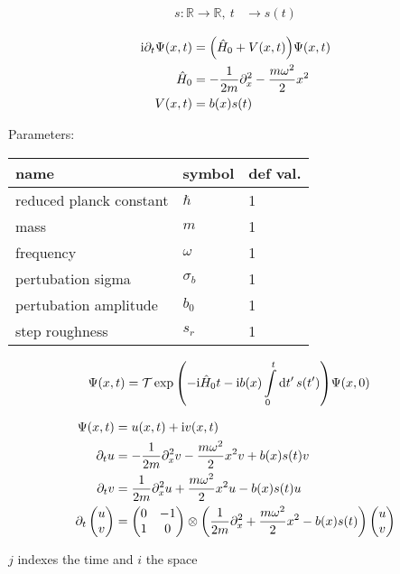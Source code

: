 \documentclass[a4paper,10pt]{article}
\newcommand{\mi}{\mathrm{i}}
\newcommand{\intl}{\int\limits}
\begin{document}
\begin{align}
    s:\mathbb{R}\to\mathbb{R},~
    t
    &\to
    s(t)
\end{align}


\begin{align}
    \mi
    \partial_t
    \Psi
    (x,t)
    &=
    \pqty{
    		\hat{H}_0
        +
        V(x,t)
    }
    \Psi
    (x,t)
\\
	\hat{H}_0
	&=
    -\frac{1}{2m}
    \partial_x^2
    -
    \frac{m\omega^2}{2}
    x^2
\\
    V(x,t)
    &=
    b(x)
    s(t)
\end{align}


Parameters:

\begin{tabular}{lll}
name&symbol&def val.\\
\hline
reduced planck constant&$\hbar$&1\\
mass&$m$&1\\
frequency&$\omega$&1\\
pertubation sigma&$\sigma_b$&1\\
pertubation amplitude&$b_0$&1\\
step roughness&$s_r$&1\
\end{tabular}





\begin{align}
    \Psi
    (x,t)
    &=
    \mathcal{T}
    \exp\pqty{
    		-
    		\mi
    		\hat{H}_0
    		t
    		-
		\mi b(x)
		\intl_0^t
		\dd{t^\prime}
		s(t^\prime)    
    }
    \Psi
    (x,0)
\end{align}



\begin{align}
	\Psi
	(x,t)
	&=
	u(x,t)
	+
	\mi v(x,t)
\\
	\partial_t u
	&=
	-
	\frac{1}{2m}
	\partial_x^2
	v
	-
	\frac{m\omega^2}{2}
	x^2
	v
	+
	b(x)
	s(t)
	v
\\
	\partial_t v
	&=
	\frac{1}{2m}
	\partial_x^2
	u
	+
	\frac{m\omega^2}{2}
	x^2
	u
	-
	b(x)
	s(t)
	u
\\
	\partial_t
	\pmqty{u\\v}
	&=
	\pmqty{0&-1\\1&0}	
	\otimes	
	\pqty{
	\frac{1}{2m}
	\partial_x^2
	+
	\frac{m\omega^2}{2}
	x^2
	-
	b(x)
	s(t)
	}
	\pmqty{u\\v}
\end{align}

$j$ indexes the time and $i$ the space
\end{document}

